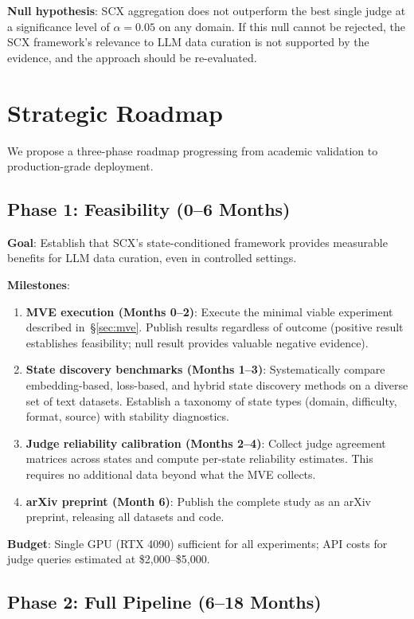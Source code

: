 \documentclass[11pt,twocolumn]{article}
\begin{document}
\textbf{Null hypothesis}: SCX aggregation does not outperform the best single judge at a significance level of $\alpha = 0.05$ on any domain. If this null cannot be rejected, the SCX framework's relevance to LLM data curation is not supported by the evidence, and the approach should be re-evaluated.

\section{Strategic Roadmap}

We propose a three-phase roadmap progressing from academic validation to production-grade deployment.

\subsection{Phase 1: Feasibility (0--6 Months)}

\textbf{Goal}: Establish that SCX's state-conditioned framework provides measurable benefits for LLM data curation, even in controlled settings.

\textbf{Milestones}:
\begin{enumerate}
    \item \textbf{MVE execution (Months 0--2)}: Execute the minimal viable experiment described in~\S\ref{sec:mve}. Publish results regardless of outcome (positive result establishes feasibility; null result provides valuable negative evidence).
    \item \textbf{State discovery benchmarks (Months 1--3)}: Systematically compare embedding-based, loss-based, and hybrid state discovery methods on a diverse set of text datasets. Establish a taxonomy of state types (domain, difficulty, format, source) with stability diagnostics.
    \item \textbf{Judge reliability calibration (Months 2--4)}: Collect judge agreement matrices across states and compute per-state reliability estimates. This requires no additional data beyond what the MVE collects.
    \item \textbf{arXiv preprint (Month 6)}: Publish the complete study as an arXiv preprint, releasing all datasets and code.
\end{enumerate}

\textbf{Budget}: Single GPU (RTX 4090) sufficient for all experiments; API costs for judge queries estimated at \$2,000--\$5,000.

\subsection{Phase 2: Full Pipeline (6--18 Months)}
\end{document}

